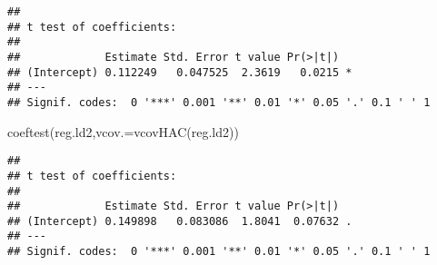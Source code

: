 \documentclass[
  oneside]{book}
\newenvironment{Shaded}{\begin{snugshade}}{\end{snugshade}}
\newcommand{\AttributeTok}[1]{\textcolor[rgb]{0.77,0.63,0.00}{#1}}
\newcommand{\DecValTok}[1]{\textcolor[rgb]{0.00,0.00,0.81}{#1}}
\newcommand{\FunctionTok}[1]{\textcolor[rgb]{0.00,0.00,0.00}{#1}}
\newcommand{\NormalTok}[1]{#1}
\newcommand{\OtherTok}[1]{\textcolor[rgb]{0.56,0.35,0.01}{#1}}
\newcommand{\SpecialCharTok}[1]{\textcolor[rgb]{0.00,0.00,0.00}{#1}}
\begin{document}
\begin{Shaded}
\end{Shaded}

\begin{verbatim}
## 
## t test of coefficients:
## 
##             Estimate Std. Error t value Pr(>|t|)  
## (Intercept) 0.112249   0.047525  2.3619   0.0215 *
## ---
## Signif. codes:  0 '***' 0.001 '**' 0.01 '*' 0.05 '.' 0.1 ' ' 1
\end{verbatim}

\begin{Shaded}
\begin{Highlighting}[]
\FunctionTok{coeftest}\NormalTok{(reg.ld2,}\AttributeTok{vcov.=}\FunctionTok{vcovHAC}\NormalTok{(reg.ld2))}
\end{Highlighting}
\end{Shaded}

\begin{verbatim}
## 
## t test of coefficients:
## 
##             Estimate Std. Error t value Pr(>|t|)  
## (Intercept) 0.149898   0.083086  1.8041  0.07632 .
## ---
## Signif. codes:  0 '***' 0.001 '**' 0.01 '*' 0.05 '.' 0.1 ' ' 1
\end{verbatim}
\end{document}
